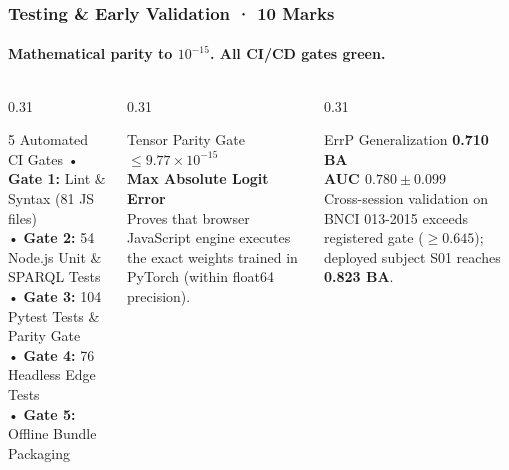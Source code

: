 \documentclass[aspectratio=169,10pt]{beamer}
\begin{document}
\begin{frame}
    \frametitle{Testing & Early Validation · 10 Marks}
    \framesubtitle{Mathematical parity to $10^{-15}$. All CI/CD gates green.}
    \begin{columns}[T]
        \begin{column}{0.31\textwidth}
            \begin{block}{\small 5 Automated CI Gates}
                \scriptsize
                • \textbf{Gate 1:} Lint \& Syntax (81 JS files)\\
                • \textbf{Gate 2:} 54 Node.js Unit \& SPARQL Tests\\
                • \textbf{Gate 3:} 104 Pytest Tests \& Parity Gate\\
                • \textbf{Gate 4:} 76 Headless Edge Tests\\
                • \textbf{Gate 5:} Offline Bundle Packaging
            \end{block}
        \end{column}
        \begin{column}{0.31\textwidth}
            \begin{block}{\small Tensor Parity Gate}
                \scriptsize
                \Large \textbf{\color{ForestGreen}$\le 9.77 \times 10^{-15}$}\\
                \scriptsize \textbf{Max Absolute Logit Error}\\
                Proves that browser JavaScript engine executes the exact weights trained in PyTorch (within float64 precision).
            \end{block}
        \end{column}
        \begin{column}{0.31\textwidth}
            \begin{block}{\small ErrP Generalization}
                \scriptsize
                \Large \textbf{\color{ForestGreen}0.710 BA}\\
                \scriptsize \textbf{AUC $0.780 \pm 0.099$}\\
                Cross-session validation on BNCI 013-2015 exceeds registered gate ($\ge 0.645$); deployed subject S01 reaches \textbf{0.823 BA}.
            \end{block}
        \end{column}
    \end{columns}
\end{frame}
\end{document}
